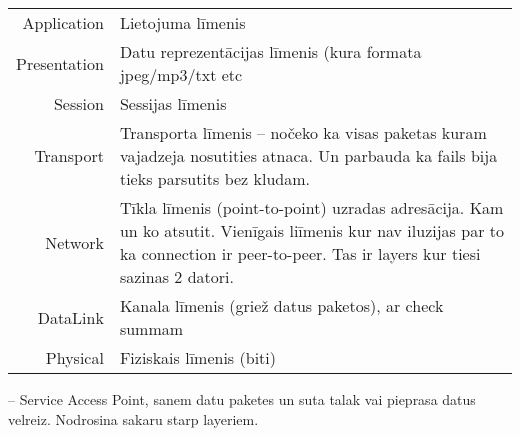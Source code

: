 \begin{center}
  \begin{tabular}{ r | l }
  \hline
  Application & Lietojuma līmenis\\
  Presentation& Datu reprezentācijas līmenis (kura formata jpeg/mp3/txt etc\\
  Session     & Sessijas līmenis   \\
  Transport   & Transporta līmenis -- nočeko ka visas paketas 
  kuram vajadzeja nosutities atnaca. Un parbauda ka fails bija tieks parsutits bez kludam.\\
  Network     & Tīkla līmenis (point-to-point) uzradas adresācija.
  Kam un ko atsutit. Vienīgais liīmenis kur nav iluzijas par to 
  ka connection ir peer-to-peer. Tas ir layers kur tiesi sazinas
   2 datori. \\
  DataLink    & Kanala līmenis (griež datus paketos), ar check summam\\
  Physical    & Fiziskais līmenis (biti) \\
  \end{tabular}
\end{center}

 -- Service Access Point, sanem datu paketes un suta talak vai pieprasa datus velreiz.
Nodrosina sakaru starp layeriem.

